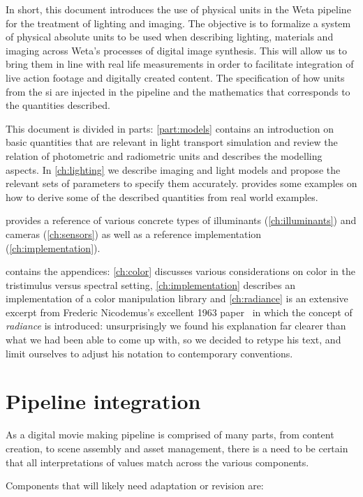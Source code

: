 In short, this document introduces the use of physical units in the
Weta pipeline for the treatment of lighting and imaging.  The
objective is to formalize a system of physical absolute units to be used
when describing lighting, materials and imaging across Weta's
processes of digital image synthesis. This will allow us to bring them in line
with real life measurements in order to facilitate integration of
live action footage and digitally created content. The specification of
how units from the \gls{si} are injected in the pipeline and the
mathematics that corresponds to the quantities described.


This document is divided in parts: \cref{part:models}
contains an introduction on basic quantities that are relevant in
light transport simulation and review the relation of photometric and
radiometric units and describes the modelling aspects. In 
\cref{ch:lighting} we describe imaging and light models and propose the
relevant sets of parameters to specify them accurately.  
 provides some examples on how to derive some of
the described quantities from real world examples.

 provides a reference of various concrete types of
illuminants (\cref{ch:illuminants}) and cameras (\cref{ch:sensors})
as well as a reference implementation (\cref{ch:implementation}).

 contains the appendices: \cref{ch:color} discusses
various considerations on color in the tristimulus versus spectral setting,
\cref{ch:implementation} describes an implementation of a color manipulation library
and \cref{ch:radiance} is an extensive excerpt from Frederic Nicodemus's 
excellent 1963 paper~\cite{nicodemus63} in which the concept of \textsl{radiance}
is introduced: unsurprisingly we found his explanation far clearer than what we 
had been able to come up with, so we decided to retype his text, and limit ourselves
to adjust his notation to contemporary conventions.

\section{Pipeline integration}

As a digital movie making pipeline is comprised of many parts, from content creation, to
scene assembly and asset management, there is a need to
be certain that all interpretations of values match across the various components.

Components that will likely need adaptation or revision are:

